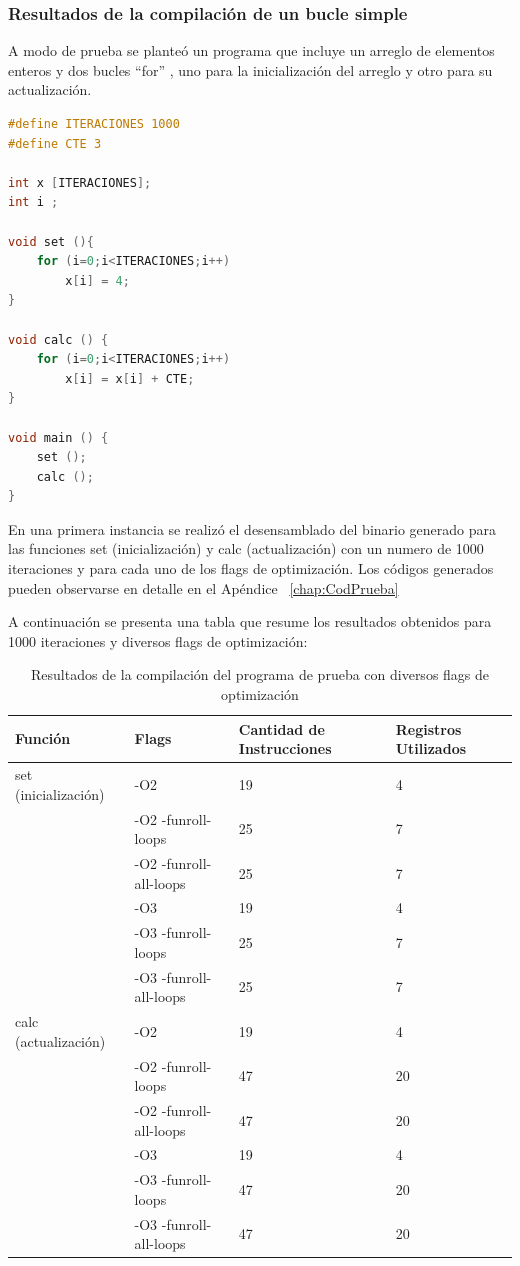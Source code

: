 		\subsubsection{Resultados de la compilación de un bucle simple}

A modo de prueba se planteó un programa que incluye un arreglo de elementos enteros y dos bucles ``for'' , uno para la inicialización del arreglo y
otro para su actualización.

	\begin{lstlisting}[language=C,frame=single]
#define ITERACIONES 1000
#define CTE 3

int x [ITERACIONES];
int i ;

void set (){
	for (i=0;i<ITERACIONES;i++)
		x[i] = 4;
}

void calc () {
	for (i=0;i<ITERACIONES;i++)
		x[i] = x[i] + CTE;
}

void main () {
	set ();
	calc ();
}
	\end{lstlisting}
		
En una primera instancia se realizó el desensamblado del binario generado para las funciones set (inicialización) y calc (actualización) con un
numero de 1000 iteraciones y para cada uno de los flags de optimización. Los códigos generados pueden observarse en detalle en el Apéndice
~\ref{chap:CodPrueba} 

A continuación se presenta una tabla que resume los resultados obtenidos para 1000 iteraciones y diversos flags de optimización:

\begin{table}[h!]
		\centering
		\begin{tabular}{ | p{4cm} | p{5cm} | p{2.5cm} | p{2cm} | }
		\hline 
		\rowcolor[gray]{0.8} Función & Flags & Cantidad de Instrucciones  & Registros Utilizados \\    
		\hline 
		set (inicialización) 	& -O2 						& 19 &  4 \\ 
		\hline 
							 	& -O2 -funroll-loops 		& 25 &  7 \\ 
		\hline 
							 	& -O2 -funroll-all-loops 	& 25 &  7 \\ 
		\hline 
							 	& -O3 						& 19 &  4 \\ 
		\hline 
							 	& -O3 -funroll-loops 		& 25 &  7 \\ 
		\hline 
							 	& -O3 -funroll-all-loops 	& 25 &  7 \\ 
		\hline 
		calc (actualización) 	& -O2						& 19 &  4 \\ 
		\hline 
							 	& -O2 -funroll-loops 		& 47 &  20 \\ 
		\hline 
							 	& -O2 -funroll-all-loops 	& 47 &  20 \\ 		
		\hline					 	
							 	& -O3 						& 19 &  4 \\ 
		\hline 
							 	& -O3 -funroll-loops 		& 47 &  20 \\ 
		\hline 
							 	& -O3 -funroll-all-loops 	& 47 &  20 \\ 		
		\hline 
		\end{tabular}
\caption{Resultados de la compilación del programa de prueba con diversos flags de optimización}
\end{table}	

